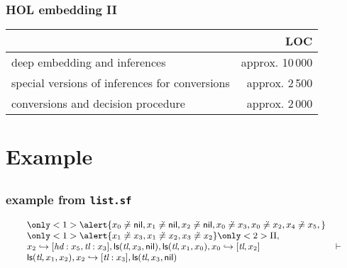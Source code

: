 \begin{frame}
\frametitle{HOL embedding II}

\begin{tabular}{|l|r|}
\hline
  & \textbf{LOC} \\\hline\hline
deep embedding and inferences & approx. 10\,000 \\
special versions of inferences for conversions & approx. 2\,500 \\
conversions and decision procedure & approx. 2\,000 \\\hline
\end{tabular}

\end{frame}

\section{Example}
\subsection*{}

\begin{frame}
\frametitle{example from \texttt{list.sf}}
\[\small\begin{array}{lr}
\only<1>{\alert{\pfunequal {x_0} \nil,\pfunequal {x_1} \nil, \pfunequal {x_2} \nil,
\pfunequal {x_0} {x_3}, \pfunequal {x_0} {x_2}, \pfunequal {x_4} {x_5},}}\\
\only<1>{\alert{\pfunequal {x_1} {x_3},
\pfunequal {x_1} {x_2}, \pfunequal {x_3} {x_2}}}
\only<2>{\Pi},\\
\sfpointsto {x_2} {\textit{hd}:x_5, \textit{tl}:x_3},
\sflist(\textit{tl},x_3,\nil), \sflist(\textit{tl},x_1,x_0),
\sfpointsto {x_0} {\textit{tl},x_2} & \vdash \\
\sflist(\textit{tl},x_1,x_2), \sfpointsto {x_2} {\textit{tl}:x_3}, \sflist(\textit{tl},x_3,\nil)
\end{array}
\]
\end{frame}

